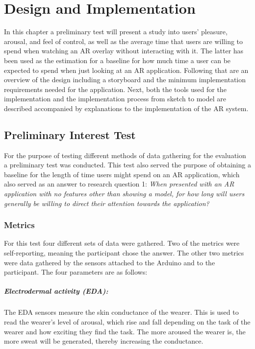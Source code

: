 \chapter{Design and Implementation}\label{ch:implementation}
In this chapter a preliminary test will present a study into users’ pleasure, arousal, and feel of control, as well as the average time that users are willing to spend when watching an AR overlay without interacting with it. The latter has been used as the estimation for a baseline for how much time a user can be expected to spend when just looking at an AR application. Following that are an overview of the design including a storyboard and the minimum implementation requirements needed for the application. Next, both the tools used for the implementation and the implementation process from sketch to model are described accompanied by explanations to the implementation of the AR system. 

\section{Preliminary Interest Test}
For the purpose of testing different methods of data gathering for the evaluation a preliminary test was conducted. This test also served the purpose of obtaining a baseline for the length of time users might spend on an AR application, which also served as an answer to research question 1: \textit{When presented with an AR application with no features other than showing a model, for how long will users generally be willing to direct their attention towards the application?}

\subsection{Metrics}\label{subsec:premetrics}
For this test four different sets of data were gathered. Two of the metrics were self-reporting, meaning the participant chose the answer. The other two metrics were data gathered by the sensors attached to the Arduino and to the participant. The four parameters are as follows:
\paragraph{Electrodermal activity (EDA):} The EDA sensors measure the skin conductance of the wearer. This is used to read the wearer’s level of arousal, which rise and fall depending on the task of the wearer and how exciting they find the task. The more aroused the wearer is, the more sweat will be generated, thereby increasing the conductance.
